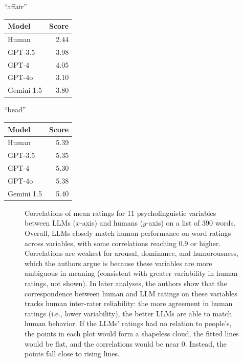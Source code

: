 \begin{center}
\begin{minipage}{0.45\linewidth}
\centering
``affair''\\[6pt]
\begin{tabular}{@{}lr@{}}
\textbf{Model} & \textbf{Score}\\\hline
Human & 2.44\\
GPT-3.5 & 3.98\\
GPT-4 & 4.05\\
GPT-4o & 3.10\\
Gemini 1.5 & 3.80\\
\end{tabular}
\end{minipage}
\hspace{0.05\linewidth}
\begin{minipage}{0.45\linewidth}
\centering
``bead''\\[6pt] 
\begin{tabular}{@{}lr@{}}
\textbf{Model} & \textbf{Score}\\\hline
Human & 5.39\\
GPT-3.5 & 5.35\\
GPT-4 & 5.30\\
GPT-4o & 5.38\\
Gemini 1.5 & 5.40\\
\end{tabular}
\end{minipage}
\end{center}

\begin{figure}[ht]
\centering
{}
\caption[From \cite{kello2026contextual}, with author
permission.]{Correlations of mean ratings  for 11 psycholinguistic variables
between LLMs ($x$-axis) and humans ($y$-axis) on a list of 390 words. Overall,
LLMs closely match human performance on word ratings across variables, with
some correlations reaching 0.9 or higher. Correlations are weakest for arousal,
dominance, and humorousness, which the authors argue is because these variables
are more ambiguous in meaning (consistent with greater variability in human
ratings, not shown). In later analyses, the authors show that the
correspondence between human and LLM ratings on these variables tracks human
inter-rater reliability: the more agreement in human ratings (i.e., lower
variability), the better LLMs are able to match human behavior. If the LLMs'
ratings had no relation to people's, the points in each plot would form a
shapeless cloud, the fitted lines would be flat, and the correlations would be
near 0. Instead, the points fall close to rising lines.}
\label{humanVsLLM}
\end{figure}

